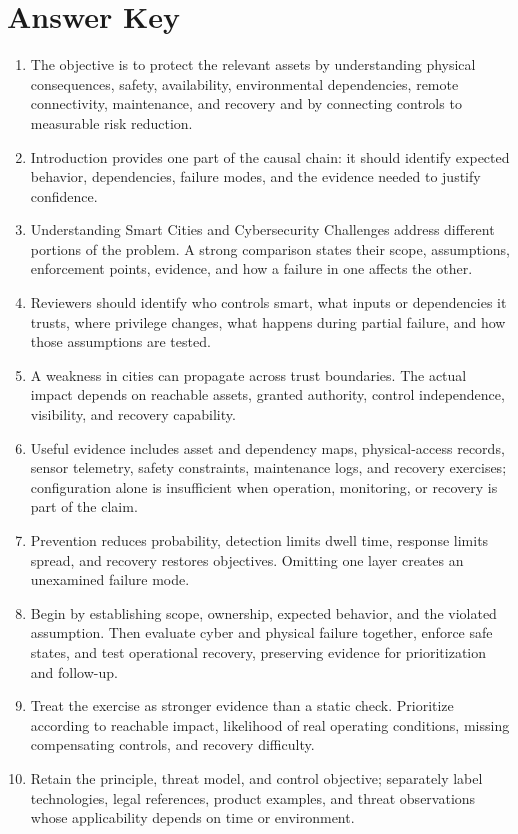 \documentclass[11pt]{article}
\begin{document}
\section*{Answer Key}
\begin{enumerate}
\item The objective is to protect the relevant assets by understanding physical consequences, safety, availability, environmental dependencies, remote connectivity, maintenance, and recovery and by connecting controls to measurable risk reduction.
\item Introduction provides one part of the causal chain: it should identify expected behavior, dependencies, failure modes, and the evidence needed to justify confidence.
\item Understanding Smart Cities and Cybersecurity Challenges address different portions of the problem. A strong comparison states their scope, assumptions, enforcement points, evidence, and how a failure in one affects the other.
\item Reviewers should identify who controls smart, what inputs or dependencies it trusts, where privilege changes, what happens during partial failure, and how those assumptions are tested.
\item A weakness in cities can propagate across trust boundaries. The actual impact depends on reachable assets, granted authority, control independence, visibility, and recovery capability.
\item Useful evidence includes asset and dependency maps, physical-access records, sensor telemetry, safety constraints, maintenance logs, and recovery exercises; configuration alone is insufficient when operation, monitoring, or recovery is part of the claim.
\item Prevention reduces probability, detection limits dwell time, response limits spread, and recovery restores objectives. Omitting one layer creates an unexamined failure mode.
\item Begin by establishing scope, ownership, expected behavior, and the violated assumption. Then evaluate cyber and physical failure together, enforce safe states, and test operational recovery, preserving evidence for prioritization and follow-up.
\item Treat the exercise as stronger evidence than a static check. Prioritize according to reachable impact, likelihood of real operating conditions, missing compensating controls, and recovery difficulty.
\item Retain the principle, threat model, and control objective; separately label technologies, legal references, product examples, and threat observations whose applicability depends on time or environment.
\end{enumerate}
\end{document}
